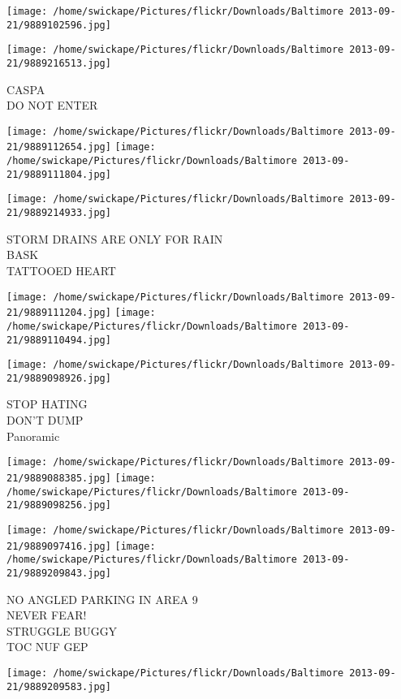 \documentclass[10pt,letterpaper]{article}
\begin{document}
\texttt{[image: /home/swickape/Pictures/flickr/Downloads/Baltimore 2013-09-21/9889102596.jpg]}

\vspace{0.25in}
\texttt{[image: /home/swickape/Pictures/flickr/Downloads/Baltimore 2013-09-21/9889216513.jpg]}

CASPA\\
DO NOT ENTER
\pagebreak

\texttt{[image: /home/swickape/Pictures/flickr/Downloads/Baltimore 2013-09-21/9889112654.jpg]}
\texttt{[image: /home/swickape/Pictures/flickr/Downloads/Baltimore 2013-09-21/9889111804.jpg]}

\vspace{0.25in}
\texttt{[image: /home/swickape/Pictures/flickr/Downloads/Baltimore 2013-09-21/9889214933.jpg]}

STORM DRAINS ARE ONLY FOR RAIN\\
BASK\\
TATTOOED HEART
\pagebreak

\texttt{[image: /home/swickape/Pictures/flickr/Downloads/Baltimore 2013-09-21/9889111204.jpg]}
\texttt{[image: /home/swickape/Pictures/flickr/Downloads/Baltimore 2013-09-21/9889110494.jpg]}

\vspace{0.25in}
\texttt{[image: /home/swickape/Pictures/flickr/Downloads/Baltimore 2013-09-21/9889098926.jpg]}

STOP HATING\\
DON'T DUMP\\
Panoramic
\pagebreak

\texttt{[image: /home/swickape/Pictures/flickr/Downloads/Baltimore 2013-09-21/9889088385.jpg]}
\texttt{[image: /home/swickape/Pictures/flickr/Downloads/Baltimore 2013-09-21/9889098256.jpg]}

\texttt{[image: /home/swickape/Pictures/flickr/Downloads/Baltimore 2013-09-21/9889097416.jpg]}
\texttt{[image: /home/swickape/Pictures/flickr/Downloads/Baltimore 2013-09-21/9889209843.jpg]}

NO ANGLED PARKING IN AREA 9\\
NEVER FEAR!\\
STRUGGLE BUGGY\\
TOC NUF GEP
\pagebreak

\texttt{[image: /home/swickape/Pictures/flickr/Downloads/Baltimore 2013-09-21/9889209583.jpg]}
\end{document}
